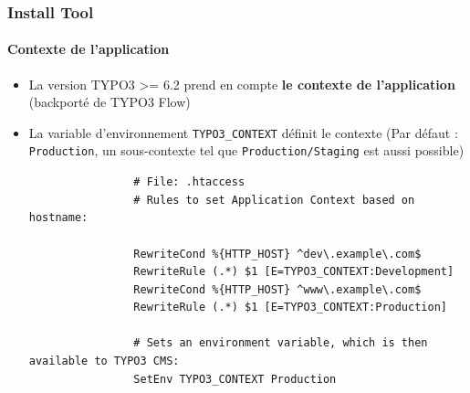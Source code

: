 
\begin{frame}[fragile]
	\frametitle{Install Tool}
	\framesubtitle{Contexte de l'application}

	\begin{itemize}
		\item La version TYPO3 >= 6.2 prend en compte \textbf{le contexte de l'application}\newline
			\smaller(backporté de TYPO3 Flow)\normalsize
		\item La variable d'environnement \texttt{TYPO3\_CONTEXT} définit le contexte\newline
			\smaller(Par défaut : \texttt{Production}, un sous-contexte tel que \texttt{Production/Staging} est aussi possible)\normalsize

			\begin{lstlisting}
				# File: .htaccess
				# Rules to set Application Context based on hostname:

				RewriteCond %{HTTP_HOST} ^dev\.example\.com$
				RewriteRule (.*) $1 [E=TYPO3_CONTEXT:Development]
				RewriteCond %{HTTP_HOST} ^www\.example\.com$
				RewriteRule (.*) $1 [E=TYPO3_CONTEXT:Production]

				# Sets an environment variable, which is then available to TYPO3 CMS:
				SetEnv TYPO3_CONTEXT Production
			\end{lstlisting}

	\end{itemize}

\end{frame}


